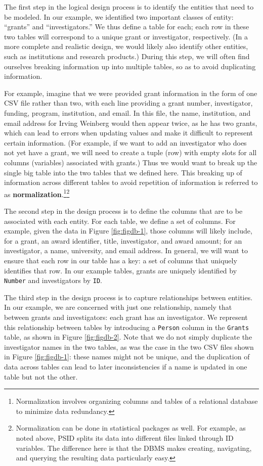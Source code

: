 \documentclass[]{krantz}
\begin{document}
The first step in the logical design process is to identify the entities
that need to be modeled. In our example, we identified two important
classes of entity: ``grants'' and ``investigators.'' We thus define a
table for each; each row in these two tables will correspond to a unique
grant or investigator, respectively. (In a more complete and realistic
design, we would likely also identify other entities, such as
institutions and research products.) During this step, we will often
find ourselves breaking information up into multiple tables, so as to
avoid duplicating information.

For example, imagine that we were provided grant information in the form
of one CSV file rather than two, with each line providing a grant
number, investigator, funding, program, institution, and email. In this
file, the name, institution, and email address for Irving Weinberg would
then appear twice, as he has two grants, which can lead to errors when
updating values and make it difficult to represent certain information.
(For example, if we want to add an investigator who does not yet have a
grant, we will need to create a tuple (row) with empty slots for all
columns (variables) associated with grants.) Thus we would want to break
up the single big table into the two tables that we defined here. This
breaking up of information across different tables to avoid repetition
of information is referred to as \textbf{normalization}.\footnote{Normalization
  involves organizing columns and tables of a relational database to
  minimize data redundancy.}\footnote{Normalization can be done in
  statistical packages as well. For example, as noted above, PSID splits
  its data into different files linked through ID variables. The
  difference here is that the DBMS makes creating, navigating, and
  querying the resulting data particularly easy.}

The second step in the design process is to define the columns that are
to be associated with each entity. For each table, we define a set of
columns. For example, given the data in Figure \ref{fig:figdb-1}, those
columns will likely include, for a grant, an award identifier, title,
investigator, and award amount; for an investigator, a name, university,
and email address. In general, we will want to ensure that each row in
our table has a key: a set of columns that uniquely identifies that row.
In our example tables, grants are uniquely identified by \texttt{Number}
and investigators by \texttt{ID}.

The third step in the design process is to capture relationships between
entities. In our example, we are concerned with just one relationship,
namely that between grants and investigators: each grant has an
investigator. We represent this relationship between tables by
introducing a \texttt{Person} column in the \texttt{Grants} table, as
shown in Figure \ref{fig:figdb-2}. Note that we do not simply duplicate
the investigator names in the two tables, as was the case in the two CSV
files shown in Figure \ref{fig:figdb-1}: these names might not be
unique, and the duplication of data across tables can lead to later
inconsistencies if a name is updated in one table but not the other.
\end{document}
